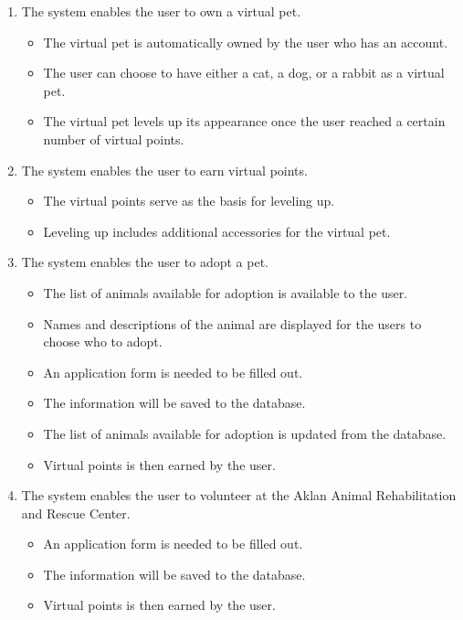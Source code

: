\begin{enumerate}
	\item The system enables the user to own a virtual pet.
	\begin{itemize}
		\item The virtual pet is automatically owned by the user who has an account.
		\item The user can choose to have either a cat, a dog, or a rabbit as a virtual pet. 
		\item The virtual pet levels up its appearance once the user reached a certain number of virtual points. 
	\end{itemize}
	
	\item The system enables the user to earn virtual points.
	\begin{itemize}
		\item The virtual points serve as the basis for leveling up.
		\item Leveling up includes additional accessories for the virtual pet.
	\end{itemize}

	\item The system enables the user to adopt a pet.
	\begin{itemize}
		\item The list of animals available for adoption is available to the user.
		\item Names and descriptions of the animal are displayed for the users to choose who to adopt.
		\item An application form is needed to be filled out. 
		\item The information will be saved to the database. 
		\item The list of animals available for adoption is updated from the database.
		\item Virtual points is then earned by the user.
	\end{itemize}
	
	
	\item The system enables the user to volunteer at the Aklan Animal Rehabilitation and Rescue Center.
	\begin{itemize}
		\item An application form is needed to be filled out.
		\item The information will be saved to the database. 
		\item Virtual points is then earned by the user.
	\end{itemize}


\end{enumerate}
